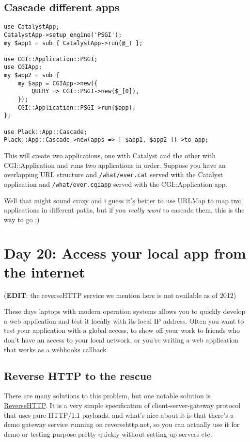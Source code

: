 \section{Cascade different apps}\label{cascade-different-apps}

\begin{lstlisting}
use CatalystApp;
CatalystApp->setup_engine('PSGI');
my $app1 = sub { CatalystApp->run(@_) };

use CGI::Application::PSGI;
use CGIApp;
my $app2 = sub {
    my $app = CGIApp->new({
        QUERY => CGI::PSGI->new($_[0]),
    });
    CGI::Application::PSGI->run($app);
};

use Plack::App::Cascade;
Plack::App::Cascade->new(apps => [ $app1, $app2 ])->to_app;
\end{lstlisting}

This will create two applications, one with Catalyst and the other with
CGI::Application and runs two applications in order. Suppose you have an
overlapping URL structure and \lstinline!/what/ever.cat! served with the
Catalyst application and \lstinline!/what/ever.cgiapp! served with the
CGI::Application app.

Well that might sound crazy and i guess it's better to use URLMap to map
two applications in different paths, but if you \emph{really want} to
cascade them, this is the way to go :)

\chapter{Day 20: Access your local app from the
internet}\label{day-20-access-your-local-app-from-the-internet}

(\textbf{EDIT}: the reverseHTTP service we mention here is not available
as of 2012)

These days laptops with modern operation systems allows you to quickly
develop a web application and test it locally with its local IP address.
Often you want to test your application with a global access, to show
off your work to friends who don't have an access to your local network,
or you're writing a web application that works as a
\href{http://www.webhooks.org/}{webhooks} callback.

\section{Reverse HTTP to the
rescue}\label{reverse-http-to-the-rescue}

There are many solutions to this problem, but one notable solution is
\href{http://www.reversehttp.net/}{ReverseHTTP}. It is a very simple
specification of client-server-gateway protocol that uses pure HTTP/1.1
payloads, and what's nice about it is that there's a demo gateway
service running on reversehttp.net, so you can actually use it for demo
or testing purpose pretty quickly without setting up servers etc.

